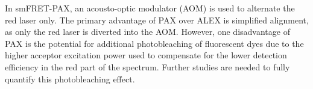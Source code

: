In smFRET-PAX, an acousto-optic modulator (\ac{AOM}) is used to alternate the red laser only. 
The primary advantage of \ac{PAX} over \ac{ALEX} is simplified alignment, as only the red laser is diverted into the \ac{AOM}. However, one disadvantage of \ac{PAX} is the potential for additional photobleaching of fluorescent dyes due to the higher acceptor excitation power used to compensate for the lower detection efficiency in the red part of the spectrum. 
Further studies are needed to fully quantify this photobleaching effect.

